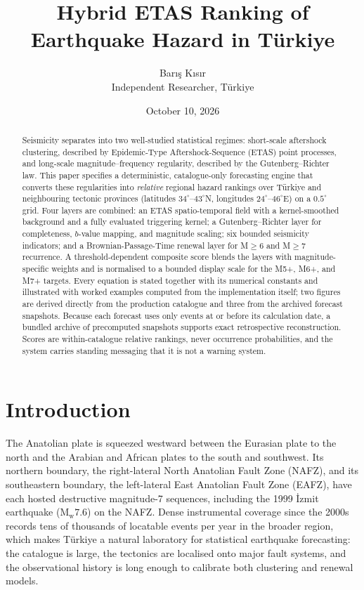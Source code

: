 \documentclass[11pt,a4paper]{article}
\title{\bfseries Hybrid ETAS Ranking of Earthquake Hazard in T\"urkiye}
\author{Bar{\i}\c{s} K{\i}s{\i}r\\
\small Independent Researcher, T\"urkiye}
\date{October 10, 2026}
\begin{document}
\maketitle

\begin{abstract}
Seismicity separates into two well-studied statistical regimes: short-scale
aftershock clustering, described by Epidemic-Type Aftershock-Sequence (ETAS)
point processes, and long-scale magnitude--frequency regularity, described by
the Gutenberg--Richter law. This paper specifies a deterministic,
catalogue-only forecasting engine that converts these regularities into
\emph{relative} regional hazard rankings over T\"urkiye and neighbouring
tectonic provinces (latitudes $34^\circ$--$43^\circ$N, longitudes
$24^\circ$--$46^\circ$E) on a $0.5^\circ$ grid. Four layers are combined:
an ETAS spatio-temporal field with a kernel-smoothed background and a fully
evaluated triggering kernel; a Gutenberg--Richter layer for completeness,
$b$-value mapping, and magnitude scaling; six bounded seismicity indicators;
and a Brownian-Passage-Time renewal layer for M$\ge$6 and M$\ge$7
recurrence. A threshold-dependent composite score blends the layers with
magnitude-specific weights and is normalised to a bounded display scale for
the M5+, M6+, and M7+ targets. Every equation is stated together with its
numerical constants and illustrated with worked examples computed from the
implementation itself; two figures are derived directly from the production
catalogue and three from the archived forecast snapshots. Because each
forecast uses only events at or before its calculation date, a bundled
archive of precomputed snapshots supports exact retrospective
reconstruction. Scores are within-catalogue relative rankings, never
occurrence probabilities, and the system carries standing messaging that it
is not a warning system.
\end{abstract}

\clearpage
\tableofcontents
\clearpage

\section{Introduction}
The Anatolian plate is squeezed westward between the Eurasian plate to the
north and the Arabian and African plates to the south and southwest. Its
northern boundary, the right-lateral North Anatolian Fault Zone (NAFZ), and
its southeastern boundary, the left-lateral East Anatolian Fault Zone (EAFZ),
have each hosted destructive magnitude-7 sequences, including the 1999
\.Izmit earthquake (M$_{\mathrm{w}}7.6$) on the NAFZ. Dense instrumental
coverage since the 2000s records tens of thousands of locatable events per
year in the broader region, which makes T\"urkiye a natural laboratory for
statistical earthquake forecasting: the catalogue is large, the tectonics are
localised onto major fault systems, and the observational history is long
enough to calibrate both clustering and renewal models.
\end{document}

